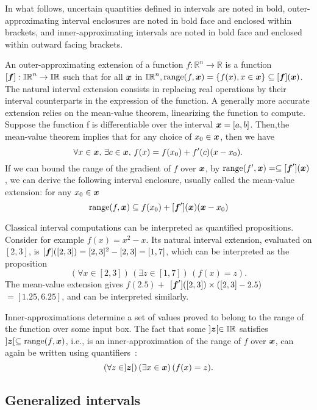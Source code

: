 \documentclass{sig-alternate-05-2015} %
\def\R{{\mathbb R}}
\DeclareMathOperator{\range}{range}
\def\I{{\Bbb I \Bbb R}}
\begin{document}
In what follows, 
uncertain quantities defined in intervals are noted in bold, outer-approximating interval enclosures are noted in bold face and enclosed within brackets, 
and inner-approximating intervals are noted in bold face and enclosed within outward facing 
brackets.

 An outer-approximating extension of a function $f: \R^n \rightarrow \R $ is a function 
$[\f]: \I^n\rightarrow \I$ such that for all $\x$ in $\I^n, \mbox{range}(f,\x)=\{f(x), x \in \x\} \subseteq [\f](\x)$.
The natural interval extension consists in replacing real
operations by their interval counterparts in the expression of the function. 
A generally more accurate extension relies on the mean-value theorem, linearizing the 
function to compute. Suppose the function f is differentiable over the interval 
$\x = [a, b]$. Then,the mean-value theorem implies that for any choice of $x_0 \in \x$, then we have
\[ \forall x \in \x, \, \exists c \in \x, \, f(x) = f(x_0) + f'(c) (x-x_0).\]
If we can bound the range of the gradient of $f$ over $\x$, by $\mbox{range}(f',\x)=\subseteq [\f'](\x)$, we can 
derive the following interval enclosure, usually called the mean-value extension: for any  $x_0 \in \x$
\[    \mbox{range}(f,\x)  \subseteq f(x_0) +  [\f'](\x) (\x - x_0) \]

Classical interval computations can be interpreted as quantified 
propositions. Consider for example $f(x)=x^2-x$.
Its natural interval extension, evaluated on $[2,3]$, is 
$[\f]([2,3])=[2,3]^2-[2,3]=[1,7]$, which can be interpreted as the proposition 
\[ (\forall x \in [2,3]) \, (\exists z \in [1,7]) \, (f(x)=z).    \]
The mean-value extension gives
$f(2.5) + $ $[\f']([2, 3]) \times ([2, 3] - 2.5)$ $ = [1.25, 6.25]$, and can be interpreted similarly.

Inner-approximations determine a set of values proved to belong to the range of the function over some input box. 
The fact that some $]\z[ \in \I$ satisfies $]\z[ \subseteq \range(f,\x)$, i.e., is an inner-approximation of the range 
of $f$ over $\x$, can again be written using quantifiers~: 
\[ (\forall z \in ]\z[) \, (\exists x \in \x) \, (f(x)=z).    \]

\subsection{Generalized intervals}
\label{Kaucherar}
\end{document}
